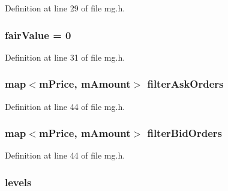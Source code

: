 Definition at line 29 of file mg.\+h.

\subsubsection[{\texorpdfstring{fair\+Value}{fairValue}}]{ fair\+Value = 0}\hypertarget{class_k_1_1_m_g_a68046d94c62e77cce36ea7de25b7927d}{}\label{class_k_1_1_m_g_a68046d94c62e77cce36ea7de25b7927d}


Definition at line 31 of file mg.\+h.

\subsubsection[{\texorpdfstring{filter\+Ask\+Orders}{filterAskOrders}}]{\setlength{\rightskip}{0pt plus 5cm}map$<${\bf m\+Price}, {\bf m\+Amount}$>$ filter\+Ask\+Orders}\hypertarget{class_k_1_1_m_g_aa30d4938235eda21a76452fd71e10ae7}{}\label{class_k_1_1_m_g_aa30d4938235eda21a76452fd71e10ae7}


Definition at line 44 of file mg.\+h.

\subsubsection[{\texorpdfstring{filter\+Bid\+Orders}{filterBidOrders}}]{\setlength{\rightskip}{0pt plus 5cm}map$<${\bf m\+Price}, {\bf m\+Amount}$>$ filter\+Bid\+Orders}\hypertarget{class_k_1_1_m_g_a7b79b121faa31d26dcd1d6e3fb9a6b24}{}\label{class_k_1_1_m_g_a7b79b121faa31d26dcd1d6e3fb9a6b24}


Definition at line 44 of file mg.\+h.

\subsubsection[{\texorpdfstring{levels}{levels}}]{ levels}\hypertarget{class_k_1_1_m_g_a1ff20b3cba9c009511bea1c21952a5ee}{}\label{class_k_1_1_m_g_a1ff20b3cba9c009511bea1c21952a5ee}


